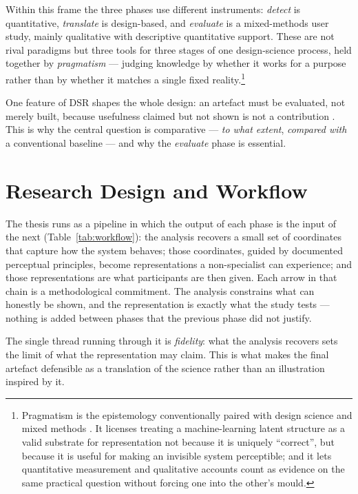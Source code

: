 Within this frame the three phases use different instruments: \emph{detect} is quantitative, \emph{translate} is design-based, and \emph{evaluate} is a mixed-methods user study, mainly qualitative with descriptive quantitative support. These are not rival paradigms but three tools for three stages of one design-science process, held together by \emph{pragmatism} --- judging knowledge by whether it works for a purpose rather than by whether it matches a single fixed reality.\footnote{Pragmatism is the epistemology conventionally paired with design science and mixed methods \citep{peffers2007}. It licenses treating a machine-learning latent structure as a valid substrate for representation not because it is uniquely ``correct'', but because it is useful for making an invisible system perceptible; and it lets quantitative measurement and qualitative accounts count as evidence on the same practical question without forcing one into the other's mould.}

One feature of DSR shapes the whole design: an artefact must be evaluated, not merely built, because usefulness claimed but not shown is not a contribution \citep{hevner2004}. This is why the central question is comparative --- \emph{to what extent}, \emph{compared with} a conventional baseline --- and why the \emph{evaluate} phase is essential.

\section{Research Design and Workflow}
\label{sec:workflow}

The thesis runs as a pipeline in which the output of each phase is the input of the next (Table~\ref{tab:workflow}): the analysis recovers a small set of coordinates that capture how the system behaves; those coordinates, guided by documented perceptual principles, become representations a non-specialist can experience; and those representations are what participants are then given. Each arrow in that chain is a methodological commitment. The analysis constrains what can honestly be shown, and the representation is exactly what the study tests --- nothing is added between phases that the previous phase did not justify.



The single thread running through it is \emph{fidelity}: what the analysis recovers sets the limit of what the representation may claim. This is what makes the final artefact defensible as a translation of the science rather than an illustration inspired by it.

